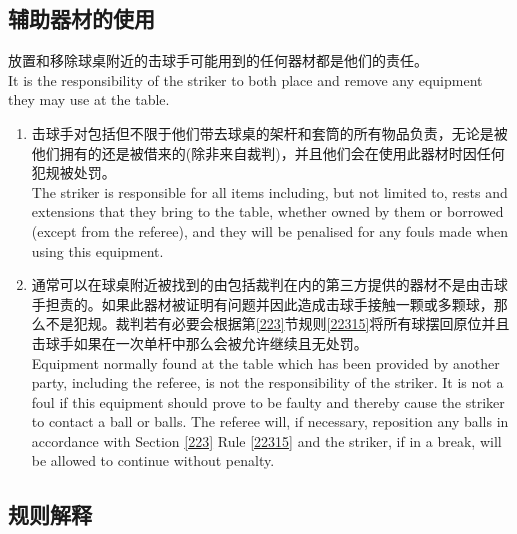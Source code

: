 \subsection{辅助器材的使用}\label{22320}

\noindent 放置和移除球桌附近的击球手可能用到的任何器材都是他们的责任。\\
It is the responsibility of the striker to both place and remove any 
equipment they may use at the table.
\begin{enumerate}[label=(\alph*)]
    \item 击球手对包括但不限于他们带去球桌的架杆和套筒的所有物品负责，无论是被他们拥有的还是被借来的(除非来自裁判)，并且他们会在使用此器材时因任何犯规被处罚。\\
    The striker is responsible for all items including, but not limited to, rests and extensions that they bring to the table, whether owned by them or borrowed (except from the referee), and they will be penalised for any fouls made when using this equipment.
    \item \label{22320b}通常可以在球桌附近被找到的由包括裁判在内的第三方提供的器材不是由击球手担责的。如果此器材被证明有问题并因此造成击球手接触一颗或多颗球，那么不是犯规。裁判若有必要会根据第\ref{223}节规则\ref{22315}将所有球摆回原位并且击球手如果在一次单杆中那么会被允许继续且无处罚。\\
    Equipment normally found at the table which has been provided by another party, including the referee, is not the responsibility of the striker. It is not a foul if this equipment should prove to be faulty and thereby cause the striker to contact a ball or balls. The referee will, if necessary, reposition any balls in accordance with Section \ref{223} Rule \ref{22315} and the striker, if in a break, will be allowed to continue without penalty.
\end{enumerate}

\subsection{规则解释}


